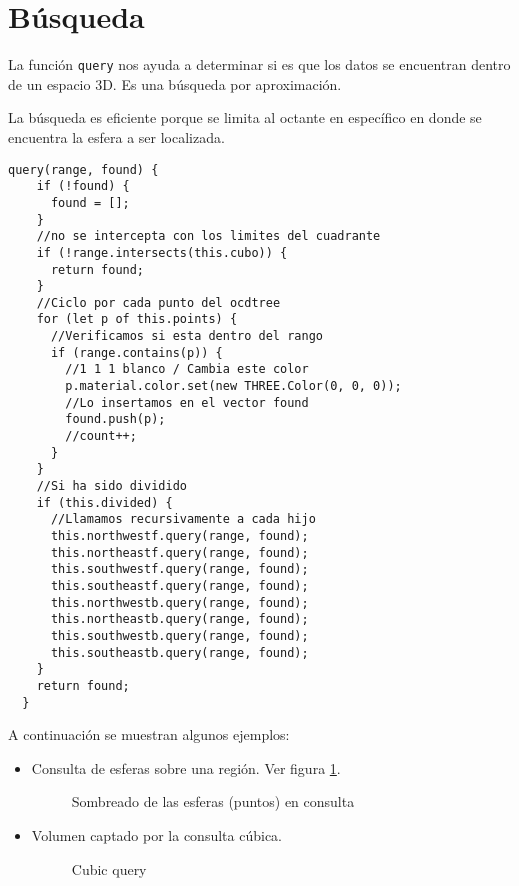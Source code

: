 \section{Búsqueda}
La función \verb!query! nos ayuda a determinar si es que los datos se encuentran dentro de un espacio 3D. Es una búsqueda por aproximación.

La búsqueda es eficiente porque se limita al octante en específico en donde se encuentra la esfera a ser localizada.

\begin{lstlisting}[caption=Consulta Octree: \textit{Point Region}]
  query(range, found) {
    if (!found) {
      found = [];
    }
    //no se intercepta con los limites del cuadrante
    if (!range.intersects(this.cubo)) {
      return found;
    }
    //Ciclo por cada punto del ocdtree
    for (let p of this.points) {
      //Verificamos si esta dentro del rango
      if (range.contains(p)) {
        //1 1 1 blanco / Cambia este color
        p.material.color.set(new THREE.Color(0, 0, 0));
        //Lo insertamos en el vector found
        found.push(p);
        //count++;
      }
    }
    //Si ha sido dividido
    if (this.divided) {
      //Llamamos recursivamente a cada hijo
      this.northwestf.query(range, found);
      this.northeastf.query(range, found);
      this.southwestf.query(range, found);
      this.southeastf.query(range, found);
      this.northwestb.query(range, found);
      this.northeastb.query(range, found);
      this.southwestb.query(range, found);
      this.southeastb.query(range, found);
    }
    return found;
  }
\end{lstlisting}

A continuación se muestran algunos ejemplos:
\begin{itemize}
    \item Consulta de esferas sobre una región. Ver figura \ref{fig:search01}.
    \begin{figure}[H]
      \centering
      \caption{Sombreado de las esferas (puntos) en consulta}
      \label{fig:search01}
    \end{figure}
    \item Volumen captado por la consulta cúbica.
    \begin{figure}[H]
      \centering
      \caption{Cubic query}
      \label{fig:search02}
    \end{figure}
\end{itemize}




